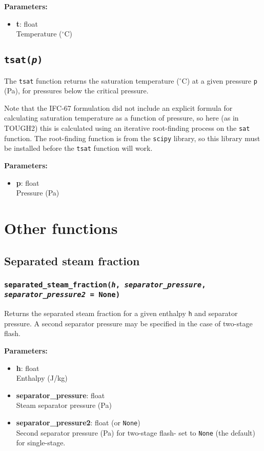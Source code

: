 \textbf{Parameters:}
\begin{itemize}
\item \textbf{t}: float\\
  Temperature ($^{\circ}$C)
\end{itemize}

\subsection{\texttt{tsat(\emph{p})}}

The \texttt{tsat} function returns the saturation temperature ($^{\circ}$C) at a given pressure \texttt{p} (Pa), for pressures below the critical pressure.

Note that the IFC-67 formulation did not include an explicit formula for calculating saturation temperature as a function of pressure, so here (as in TOUGH2) this is calculated using an iterative root-finding process on the \texttt{sat} function.  The root-finding function is from the \texttt{scipy} library, so this library must be installed before the \texttt{tsat} function will work.

\textbf{Parameters:}
\begin{itemize}
\item \textbf{p}: float\\
  Pressure (Pa)
\end{itemize}

\section{Other functions}

\subsection{Separated steam fraction}

\subsubsection{\texttt{separated\_steam\_fraction(\emph{h}, \emph{separator\_pressure}, \emph{separator\_pressure2} = None)}}

Returns the separated steam fraction for a given enthalpy \texttt{h} and separator pressure.  A second separator pressure may be specified in the case of two-stage flash.

\textbf{Parameters:}
\begin{itemize}
\item \textbf{h}: float\\
  Enthalpy (J/kg)
\item \textbf{separator\_pressure}: float\\
  Steam separator pressure (Pa)
\item \textbf{separator\_pressure2}: float (or \texttt{None})\\
  Second separator pressure (Pa) for two-stage flash- set to \texttt{None} (the default) for single-stage.
\end{itemize}

